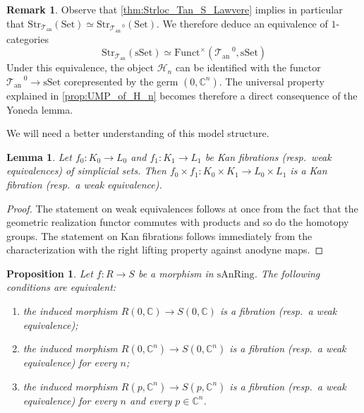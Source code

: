 \documentclass[12pt,a4paper,reqno]{amsart}
\theoremstyle{plain}
\newtheorem{lem}[thm]{Lemma}
\newtheorem{prop}[thm]{Proposition}
\theoremstyle{definition}
\newtheorem{rem}[thm]{Remark}
\theoremstyle{remark}
\numberwithin{equation}{section}
\begin{document}
\begin{rem}
	Observe that \cref{thm:Strloc_Tan_S_Lawvere} implies in particular that ${\mathrm{Str}}_{{\mathcal T}_{\mathrm{an}}}({\mathrm{Set}}) \simeq {\mathrm{Str}}_{{{\mathcal T}_{\mathrm{an}}}^{\; \! 0}}({\mathrm{Set}})$.
	We therefore deduce an equivalence of $1$-categories
	\[ {\mathrm{Str}}_{{\mathcal T}_{\mathrm{an}}}({\mathrm{sSet}}) \simeq \mathrm{Funct}^\times({{{\mathcal T}_{\mathrm{an}}}^{\; \! 0}}, {\mathrm{sSet}}) \]
	Under this equivalence, the object ${\mathcal H}_n$ can be identified with the functor ${{{\mathcal T}_{\mathrm{an}}}^{\; \! 0}} \to {\mathrm{sSet}}$ corepresented by the germ $(0, \mathbb C^n)$.
	The universal property explained in \cref{prop:UMP_of_H_n} becomes therefore a direct consequence of the Yoneda lemma.
\end{rem}

We will need a better understanding of this model structure.

\begin{lem}
	Let $f_0 \colon K_0 \to L_0$ and $f_1 \colon K_1 \to L_1$ be Kan fibrations (resp.\ weak equivalences) of simplicial sets.
	Then $f_0 \times f_1 \colon K_0 \times K_1 \to L_0 \times L_1$ is a Kan fibration (resp.\ a weak equivalence).
\end{lem}

\begin{proof}
	The statement on weak equivalences follows at once from the fact that the geometric realization functor commutes with products and so do the homotopy groups.
	The statement on Kan fibrations follows immediately from the characterization with the right lifting property against anodyne maps.
\end{proof}

\begin{prop} \label{prop:strict_model_fibration_weak_equiv}
	Let $f \colon R \to S$ be a morphism in $\mathrm{sAnRing}$.
	The following conditions are equivalent:
	\begin{enumerate}
		\item the induced morphism $R(0, \mathbb C) \to S(0, \mathbb C)$ is a fibration (resp.\ a weak equivalence);
		\item the induced morphism $R(0, \mathbb C^n) \to S(0, \mathbb C^n)$ is a fibration (resp.\ a weak equivalence) for every $n$;
		\item the induced morphism $R(p, \mathbb C^n) \to S(p, \mathbb C^n)$ is a fibration (resp.\ a weak equivalence) for every $n$ and every $p \in \mathbb C^n$.
	\end{enumerate}
\end{prop}
\end{document}
